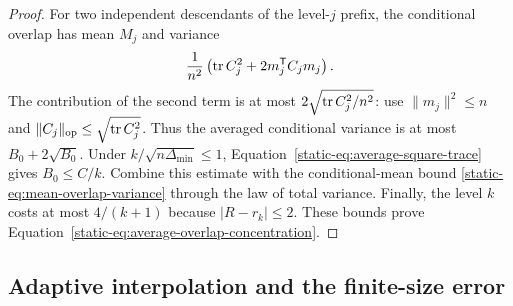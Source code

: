 \begin{proof}
For two independent descendants of the level-$j$ prefix, the
conditional overlap has mean $M_j$ and variance
\[
 \frac1{n^2}\left(\operatorname{tr} C_j^2+2m_j^{\mathsf T}C_jm_j\right).
\]
The contribution of the second term is at most
$2\sqrt{\operatorname{tr} C_j^2/n^2}$: use $\|m_j\|^2\le n$ and
$\|C_j\|_{\rm op}\le\sqrt{\operatorname{tr} C_j^2}$. Thus the averaged
conditional variance is at most $B_0+2\sqrt{B_0}$.
Under $k/\sqrt{n\Delta_{\min}}\le1$,
Equation~\eqref{static-eq:average-square-trace} gives $B_0\le C/k$.
Combine this estimate with the conditional-mean bound
\eqref{static-eq:mean-overlap-variance} through the law of total
variance. Finally, the level $k$ costs at most $4/(k+1)$ because
$|R-r_k|\le2$. These bounds prove
Equation~\eqref{static-eq:average-overlap-concentration}.
\end{proof}

\subsection{Adaptive interpolation and the finite-size error}

